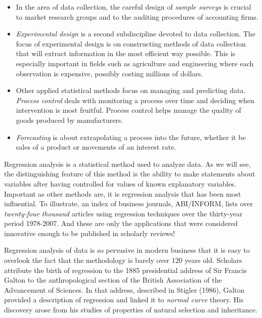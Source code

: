 \begin{itemize}
\item In the area of data collection, the careful design of \emph{sample
surveys} is crucial to market research groups and to the auditing procedures
of accounting firms.

\item \emph{Experimental design} is a second subdiscipline devoted to data
collection. The focus of experimental design is on constructing methods of
data collection that will extract information in the most efficient way
possible. This is especially important in fields such as agriculture and
engineering where each observation is expensive, possibly costing millions
of dollars.

\item Other applied statistical methods focus on managing and predicting
data. \emph{Process control} deals with monitoring a process over time and
deciding when intervention is most fruitful. Process control helps manage
the quality of goods produced by manufacturers.

\item \emph{Forecasting} is about extrapolating a process into the future,
whether it be sales of a product or movements of an interest rate.
\end{itemize}

Regression analysis is a statistical method used to analyze data. As
we will see, the distinguishing feature of this method is the
ability to make statements about variables after having controlled
for values of known explanatory variables. Important as other
methods are, it is regression analysis that has been most
influential. To illustrate, an index of business journals,
ABI/INFORM, lists over \emph{twenty-four thousand} articles using
regression techniques over the thirty-year period 1978-2007. And
these are only the applications that were considered innovative
enough to be published in scholarly reviews!

Regression analysis of data is so pervasive in modern business that
it is easy to overlook the fact that the methodology is barely over
120 years old. Scholars attribute the birth of regression to the
1885 presidential address of Sir Francis Galton to the
anthropological section of the British Association of the
Advancement of Sciences. In that address, described in Stigler
(1986), Galton provided a description of regression and linked it to
\emph{normal curve} theory. His discovery arose from his studies of
properties of natural selection and inheritance.


